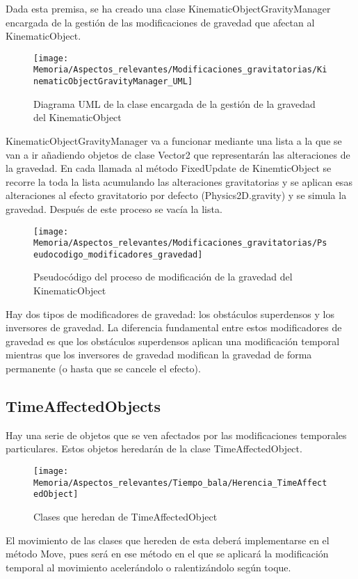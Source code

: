 Dada esta premisa, se ha creado una clase KinematicObjectGravityManager encargada de la gestión de las modificaciones de gravedad que afectan al KinematicObject.

\begin{figure}[h]
\centering
\texttt{[image: Memoria/Aspectos\_relevantes/Modificaciones\_gravitatorias/KinematicObjectGravityManager\_UML]}
\caption{Diagrama UML de la clase encargada de la gestión de la gravedad del KinematicObject}
\end{figure}

KinematicObjectGravityManager va a funcionar mediante una lista a la que se van a ir añadiendo objetos de clase Vector2 que representarán las alteraciones de la gravedad. En cada llamada al método FixedUpdate de KinemticObject se recorre la toda la lista acumulando las alteraciones gravitatorias y se aplican esas alteraciones al efecto gravitatorio por defecto (Physics2D.gravity) y se simula la gravedad. Después de este proceso se vacía la lista.

\begin{figure}[h]
\centering
\texttt{[image: Memoria/Aspectos\_relevantes/Modificaciones\_gravitatorias/Pseudocodigo\_modificadores\_gravedad]}
\caption{Pseudocódigo del proceso de modificación de la gravedad del KinematicObject}
\end{figure}

Hay dos tipos de modificadores de gravedad: los obstáculos superdensos y los inversores de gravedad. La diferencia fundamental entre estos modificadores de gravedad es que los obstáculos superdensos aplican una modificación temporal mientras que los inversores de gravedad modifican la gravedad de forma permanente (o hasta que se cancele el efecto).

\subsection{TimeAffectedObjects}
Hay una serie de objetos que se ven afectados por las modificaciones temporales particulares. Estos objetos heredarán de la clase TimeAffectedObject. 

\begin{figure}[h]
\texttt{[image: Memoria/Aspectos\_relevantes/Tiempo\_bala/Herencia\_TimeAffectedObject]}
\caption{Clases que heredan de TimeAffectedObject}
\end{figure}

El movimiento de las clases que hereden de esta deberá implementarse en el método Move, pues será en ese método en el que se aplicará la modificación temporal al movimiento acelerándolo o ralentizándolo según toque.


